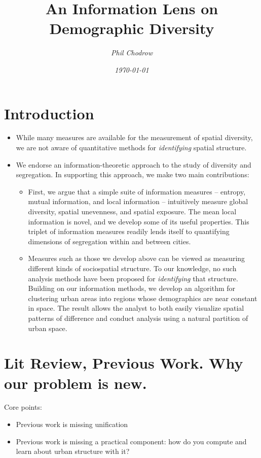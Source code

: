 \documentclass[english]{scrartcl}
\title{An Information Lens on Demographic Diversity} %
\author{\emph{Phil Chodrow}}
\date{\emph{\today}}
\begin{document}

\maketitle

\abstract{}

\section{Introduction} \label{sec:intro}
	\begin{itemize}
		\item While many measures are available for the measurement of spatial diversity, we are not aware of quantitative methods for \emph{identifying} spatial structure. 
		\item We endorse an information-theoretic approach to the study of diversity and segregation. In supporting this approach, we make two main contributions: 
		\begin{itemize}
			\item First, we argue that a simple suite of information measures -- entropy, mutual information, and local information -- intuitively measure global diversity, spatial unevenness, and spatial exposure. The mean local information is novel, and we develop some of its useful properties. This triplet of information measures readily lends itself to quantifying dimensions of segregation within and between cities. 
			\item Measures such as those we develop above can be viewed as measuring different kinds of sociospatial structure. To our knowledge, no such analysis methods have been proposed for \emph{identifying} that structure. Building on our information methods, we develop an algorithm for clustering urban areas into regions whose demographics are near constant in space. The result allows the analyst to both easily visualize spatial patterns of difference and conduct analysis using a natural partition of urban space. 
		\end{itemize}
	\end{itemize}
\section{Lit Review, Previous Work. Why our problem is new.} \label{sec:previous}
	Core points: 
	\begin{itemize}
		\item Previous work is missing unification
		\item Previous work is missing a practical component: how do you compute and learn about urban structure with it? 
	\end{itemize}
\end{document}
